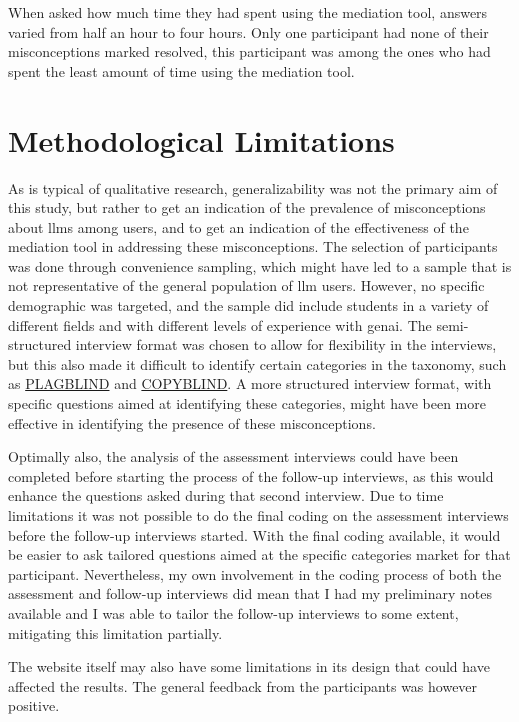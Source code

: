 When asked how much time they had spent using the mediation tool, answers varied from half an hour to four hours. Only one participant had none of their misconceptions marked resolved, this participant was among the ones who had spent the least amount of time using the mediation tool. 

\section{Methodological Limitations}
As is typical of qualitative research, generalizability was not the primary aim of this study, but rather to get an indication of the prevalence of misconceptions about \gls{llms} among users, and to get an indication of the effectiveness of the mediation tool in addressing these misconceptions. 
The selection of participants was done through convenience sampling, which might have led to a sample that is not representative of the general population of \gls{llm} users. However, no specific demographic was targeted, and the sample did include students in a variety of different fields and with different levels of experience with \gls{genai}.
The semi-structured interview format was chosen to allow for flexibility in the interviews, but this also made it difficult to identify certain categories in the taxonomy, such as \hyperref[plagblind]{PLAGBLIND} and \hyperref[copyblind]{COPYBLIND}. A more structured interview format, with specific questions aimed at identifying these categories, might have been more effective in identifying the presence of these misconceptions.

Optimally also, the analysis of the assessment interviews could have been completed before starting the process of the follow-up interviews, as this would enhance the questions asked during that second interview. Due to time limitations it was not possible to do the final coding on the assessment interviews before the follow-up interviews started. With the final coding available, it would be easier to ask tailored questions aimed at the specific categories market for that participant.
Nevertheless, my own involvement in the coding process of both the assessment and follow-up interviews did mean that I had my preliminary notes available and I was able to tailor the follow-up interviews to some extent, mitigating this limitation partially.

The website itself may also have some limitations in its design that could have affected the results. The general feedback from the participants was however positive.
